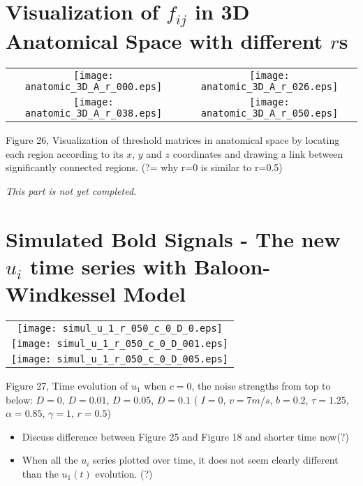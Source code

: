 \documentclass{article}
\begin{document}
\section{Visualization of $f_{ij}$ in 3D Anatomical Space with different $r$s}
\begin{center}
  \begin{tabular}{@{} cc@{} }
    \texttt{[image: anatomic\_3D\_A\_r\_000.eps]} &
    \texttt{[image: anatomic\_3D\_A\_r\_026.eps]} \\
    \texttt{[image: anatomic\_3D\_A\_r\_038.eps]} &
    \texttt{[image: anatomic\_3D\_A\_r\_050.eps]} \\
  \end{tabular}
\begin{footnotesize}
 Figure 26, Visualization of threshold matrices in anatomical space by locating each region according to its $x$, $y$ and $z$ coordinates and drawing a link between significantly connected regions. (?= why r=0 is similar to r=0.5)
\end{footnotesize}
\end{center}

\textit{This part is not yet completed.}


\section{Simulated Bold Signals - The new $u_i$ time series with Baloon-Windkessel Model }
\begin{center}
  \begin{tabular}{@{} c@{} }
    \texttt{[image: simul\_u\_1\_r\_050\_c\_0\_D\_0.eps]} \\
    \texttt{[image: simul\_u\_1\_r\_050\_c\_0\_D\_001.eps]} \\
    \texttt{[image: simul\_u\_1\_r\_050\_c\_0\_D\_005.eps]} \\
  \end{tabular}
\begin{footnotesize}
 Figure 27, Time evolution of $u_1$ when $c=0$, the noise strengths from top to below: $D=0$, $D=0.01$, $D=0.05$, $D=0.1$ ( $I=0$, $v=7m/s$, $b=0.2$, $\tau=1.25$, $\alpha=0.85$, $\gamma=1$, $r=0.5$)
\end{footnotesize}
\end{center}

\begin{itemize}
 \item Discuss difference between Figure 25 and Figure 18 and shorter time now(?)
 \item When all the $u_i$ series plotted over time, it does not seem clearly different than the $u_1(t)$ evolution. (?)
\end{itemize} 
\end{document}

